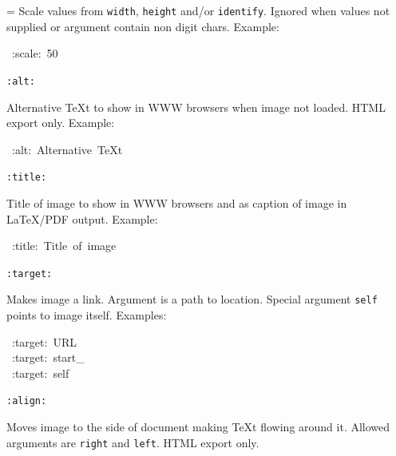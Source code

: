 \documentclass[12pt]{article}
\newenvironment{deflist}[1]{%
\begin{list}{}
{\renewcommand{\makelabel}[1]{\textbf{##1}\hfill}
\settowidth{\labelwidth}{\textbf{#1}}
\leftmargin=\labelwidth
\advance \leftmargin\labelsep}}
{\end{list}}
\begin{document}
\begin{itemize}
\begin{deflist}{iii}
Scale values from \texttt{width}, \texttt{height} and/or \texttt{identify}. Ignored
when values not supplied or argument contain non digit chars. Example:

\begin{ttfamily}\begin{flushleft}
\mbox{~:scale:~50}\\
\end{flushleft}\end{ttfamily}

\item[ \texttt{:alt:}]

Alternative \TeX{}t to show in WWW browsers when image not loaded. HTML
export only. Example:

\begin{ttfamily}\begin{flushleft}
\mbox{~:alt:~Alternative~\TeX{}t}\\
\end{flushleft}\end{ttfamily}

\item[ \texttt{:title:}]

Title of image to show in WWW browsers and as caption of image in
\LaTeX{}/PDF output. Example:

\begin{ttfamily}\begin{flushleft}
\mbox{~:title:~Title~of~image}\\
\end{flushleft}\end{ttfamily}

\item[ \texttt{:target:}]

Makes image a link. Argument is a path to location. Special argument
\texttt{self} points to image itself. Examples:

\begin{ttfamily}\begin{flushleft}
\mbox{~:target:~URL}\\
\mbox{~:target:~start\_}\\
\mbox{~:target:~self}\\
\end{flushleft}\end{ttfamily}

\item[ \texttt{:align:}]

Moves image to the side of document making \TeX{}t flowing around it.
Allowed arguments are \texttt{right} and \texttt{left}. HTML export only.


\end{deflist}
\end{itemize}
\end{document}
